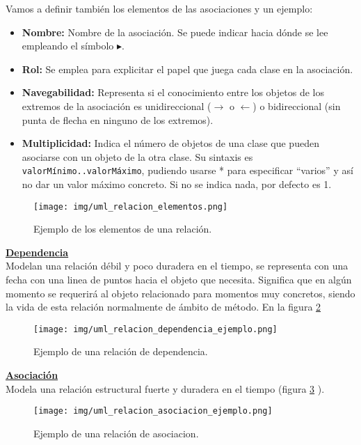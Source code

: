 \documentclass[10pt,a4paper,titlepage]{article}
\begin{document}
Vamos a definir también los elementos de las asociaciones y un ejemplo:
\begin{itemize}
\item \textbf{Nombre:} Nombre de la asociación. Se puede indicar hacia dónde se lee empleando el símbolo $\blacktriangleright$.
\item \textbf{Rol:} Se emplea para explicitar el papel que juega cada clase en la asociación.
\item \textbf{Navegabilidad:} Representa si el conocimiento entre los objetos de los extremos de la asociación es unidireccional ($\rightarrow$ o $\leftarrow$) o bidireccional (sin punta de flecha en ninguno de los extremos).
\item \textbf{Multiplicidad:} Indica el número de objetos de una clase
que pueden asociarse con un objeto de la otra clase. Su sintaxis es \texttt{valorMínimo..valorMáximo}, pudiendo usarse * para especificar ``varios'' y así no dar un valor máximo concreto. Si no se indica nada, por defecto es 1.
\end{itemize}
\begin{figure}[H] %
\centering
\texttt{[image: img/uml\_relacion\_elementos.png]}
\caption{Ejemplo de los elementos de una relación.} \label{fig:uml_rel_elementos}
\end{figure}

\underline{\textbf{Dependencia}}\\
Modelan una relación débil y poco duradera en el tiempo, se representa con una fecha con una linea de puntos hacia el objeto que necesita. Significa que en algún momento se requerirá al objeto relacionado para momentos muy concretos, siendo la vida de esta relación normalmente de ámbito de método. En la figura \ref{fig:uml_rel_dependencia}
\begin{figure}[H] %
\centering
\texttt{[image: img/uml\_relacion\_dependencia\_ejemplo.png]}
\caption{Ejemplo de una relación de dependencia.} \label{fig:uml_rel_dependencia}
\end{figure}

\underline{\textbf{Asociación}}\\
Modela una relación estructural fuerte y duradera en el tiempo (figura \ref{fig:uml_rel_asociacion} ).
\begin{figure}[H] %
\centering
\texttt{[image: img/uml\_relacion\_asociacion\_ejemplo.png]}
\caption{Ejemplo de una relación de asociacion.} \label{fig:uml_rel_asociacion}
\end{figure}
\end{document}
